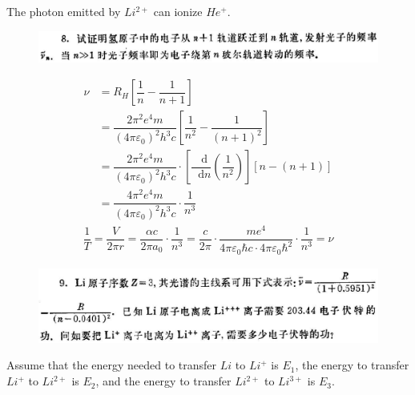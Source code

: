 \documentclass{article}
\newcommand*{\md}{\mathop{}\!\mathrm{d}}
\begin{document}
The photon emitted by $Li^{2+}$ can ionize $He^+$.

\begin{figure}[H]
  \centering
  \includegraphics[width=\linewidth]{figures/Problem8}
  \label{fig:}
\end{figure}

\begin{equation*}
  \begin{aligned}
    \nu &= R_H \left[ \dfrac{1}{n} - \dfrac{1}{n + 1}  \right] \\
    &= \dfrac{2 \pi^2 e^4 m}{\left( 4 \pi \varepsilon_0 \right)^2 h^3 c} \left[ \dfrac{1}{n^2} - \dfrac{1}{\left( n + 1 \right)^2}  \right] \\
    &= \dfrac{2 \pi^2 e^4 m}{\left( 4 \pi \varepsilon_0 \right)^2 h^3 c} \cdot \left[\dfrac{\md}{\md n}\left( \dfrac{1}{n^2}  \right)  \right] \left[ n - \left( n + 1 \right) \right]\\
    &= \dfrac{4 \pi^2 e^4 m}{\left( 4 \pi \varepsilon_0 \right)^2 h^3 c} \cdot \dfrac{1}{n^3} 
  \end{aligned}
\end{equation*}
\begin{equation*}
  \begin{aligned}
    \dfrac{1}{T} =  \dfrac{V}{2 \pi r} = \dfrac{\alpha c}{2 \pi a_0} \cdot \dfrac{1}{n^3} = \dfrac{c}{2 \pi} \cdot \dfrac{m e^4}{4 \pi \varepsilon_0 \hbar c \cdot 4 \pi \varepsilon_0 \hbar^2} \cdot \dfrac{1}{n^3} = \nu
  \end{aligned}
\end{equation*}

\begin{figure}[H]
  \centering
  \includegraphics[width=\linewidth]{figures/Problem9}
  \label{fig:}
\end{figure}

Assume that the energy needed to transfer $Li$ to $Li^+$ is $E_1$, the energy to transfer $Li^+$ to $Li^{2+}$ is $E_2$, and the energy to transfer $Li^{2+}$ to $Li^{3+}$ is $E_3$.
\end{document}
